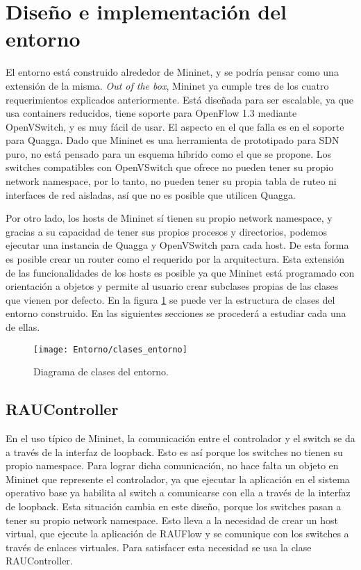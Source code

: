 \section{Diseño e implementación del entorno}
El entorno está construido alrededor de Mininet, y se podría pensar como una extensión de la misma. \textit{Out of the box}, Mininet ya cumple tres de los cuatro requerimientos explicados anteriormente. Está diseñada para ser escalable, ya que usa containers reducidos, tiene soporte para OpenFlow 1.3 mediante OpenVSwitch, y es muy fácil de usar. El aspecto en el que falla es en el soporte para Quagga. Dado que Mininet es una herramienta de prototipado para SDN puro, no está pensado para un esquema híbrido como el que se propone. Los switches compatibles con OpenVSwitch que ofrece no pueden tener su propio network namespace, por lo tanto, no pueden tener su propia tabla de ruteo ni interfaces de red aisladas, así que no es posible que utilicen Quagga.

Por otro lado, los hosts de Mininet sí tienen su propio network namespace, y gracias a su capacidad de tener sus propios procesos y directorios, podemos ejecutar una instancia de Quagga y OpenVSwitch para cada host. De esta forma es posible crear un router como el requerido por la arquitectura. Esta extensión de las funcionalidades de los hosts es posible ya que Mininet está programado con orientación a objetos y permite al usuario crear subclases propias de las clases que vienen por defecto. En la figura \ref{fig:clases_entorno} se puede ver la estructura de clases del entorno construido. En las siguientes secciones se procederá a estudiar cada una de ellas.

\begin{figure}[t]
	\caption{Diagrama de clases del entorno.}
	\texttt{[image: Entorno/clases\_entorno]}
	\centering
	\label{fig:clases_entorno}
\end{figure}

\subsection{RAUController}
En el uso típico de Mininet, la comunicación entre el controlador y el switch se da a través de la interfaz de loopback. Esto es así porque los switches no tienen su propio namespace. Para lograr dicha comunicación, no hace falta un objeto en Mininet que represente el controlador, ya que ejecutar la aplicación en el sistema operativo base ya habilita al switch a comunicarse con ella a través de la interfaz de loopback. Esta situación cambia en este diseño, porque los switches pasan a tener su propio network namespace. Esto lleva a la necesidad de crear un host virtual, que ejecute la aplicación de RAUFlow y se comunique con los switches a través de enlaces virtuales. Para satisfacer esta necesidad se usa la clase RAUController.

